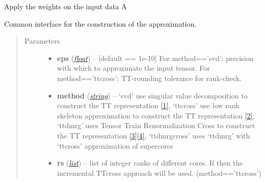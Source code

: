 \documentclass[a4paper,10pt,english]{sphinxmanual}
\begin{document}
\begin{fulllineitems}
\begin{quote}
\begin{description}
\begin{itemize}
\end{itemize}

\end{description}\end{quote}

\begin{fulllineitems}
\label{api-core:TensorToolbox.core.WTTvec.apply_weights_on_data}
Apply the weights on the input data A

\end{fulllineitems}


\begin{fulllineitems}
\label{api-core:TensorToolbox.core.WTTvec.build}
Common interface for the construction of the approximation.
\begin{quote}\begin{description}
\item[{Parameters}] \leavevmode\begin{itemize}
\item {} 
\textbf{eps} (\href{http://docs.python.org/library/functions.html\#float}{\emph{float}}) -- {[}default == 1e-10{]} For method=='svd': precision with which to approximate the input tensor. For method=='ttcross': TT-rounding tolerance for rank-check.

\item {} 
\textbf{method} (\href{http://docs.python.org/library/string.html\#module-string}{\emph{string}}) -- `svd' use singular value decomposition to construct the TT representation {\hyperref[zrefs:oseledets2011]{{[}1{]}}}, `ttcross' use low rank skeleton approximation to construct the TT representation {\hyperref[zrefs:oseledets2010]{{[}2{]}}}, `ttdmrg' uses Tensor Train Renormalization Cross to construct the TT representation {\hyperref[zrefs:savostyanov2011]{{[}3{]}}}{\hyperref[zrefs:savostyanov2013]{{[}4{]}}}, `ttdmrgcross' uses `ttdmrg' with `ttcross' approximation of supercores

\item {} 
\textbf{rs} (\href{http://docs.python.org/library/functions.html\#list}{\emph{list}}) -- list of integer ranks of different cores. If  then the incremental TTcross approach will be used. (method=='ttcross')


\end{itemize}
\end{description}
\end{quote}
\end{fulllineitems}
\end{fulllineitems}
\end{document}
